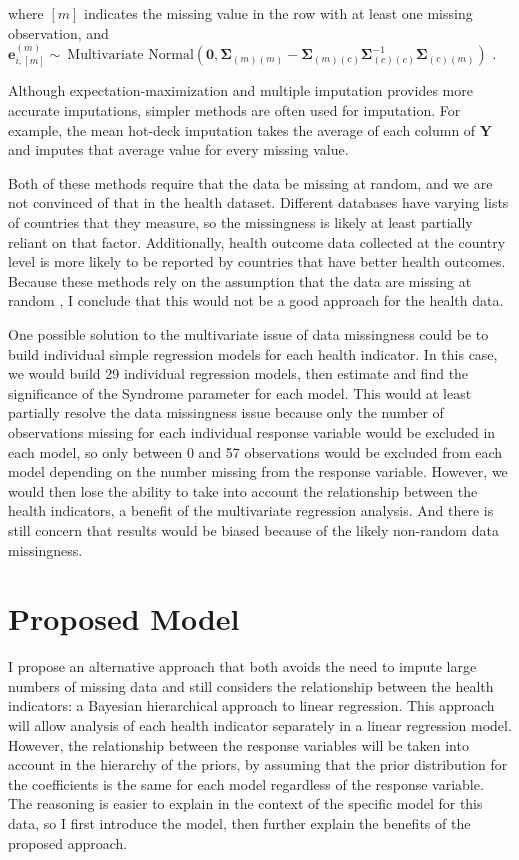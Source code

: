 where $[m]$ indicates the missing value in the row with at least one missing observation, and $\mathbf{e}_{i,[m]}^{(m)} \sim\ \text{Multivariate Normal}(\mathbf{0},\boldsymbol{\Sigma}_{(m)(m)}-\boldsymbol{\Sigma}_{(m)(c)}\boldsymbol{\Sigma}_{(c)(c)}^{-1}\boldsymbol{\Sigma}_{(c)(m)})$ \citep{Rencher}.

Although expectation-maximization and multiple imputation provides more accurate imputations, simpler methods are often used for imputation. For example, the mean hot-deck imputation takes the average of each column of $\mathbf{Y}$ and imputes that average value for every missing value.

Both of these methods require that the data be missing at random, and we are not convinced of that in the health dataset. Different databases have varying lists of countries that they measure, so the missingness is likely at least partially reliant on that factor. Additionally, health outcome data collected at the country level is more likely to be reported by countries that have better health outcomes. Because these methods rely on the assumption that the data are missing at random \citep{Rencher}, I conclude that this would not be a good approach for the health data.

One possible solution to the multivariate issue of data missingness could be to build individual simple regression models for each health indicator. In this case, we would build 29 individual regression models, then estimate and find the significance of the Syndrome parameter for each model. This would at least partially resolve the data missingness issue because only the number of observations missing for each individual response variable would be excluded in each model, so only between 0 and 57 observations would be excluded from each model depending on the number missing from the response variable. However, we would then lose the ability to take into account the relationship between the health indicators, a benefit of the multivariate regression analysis. And there is still concern that results would be biased because of the likely non-random data missingness.

\section{Proposed Model}

I propose an alternative approach that both avoids the need to impute large numbers of missing data and still considers the relationship between the health indicators: a Bayesian hierarchical approach to linear regression. This approach will allow analysis of each health indicator separately in a linear regression model. However, the relationship between the response variables will be taken into account in the hierarchy of the priors, by assuming that the prior distribution for the coefficients is the same for each model regardless of the response variable. The reasoning is easier to explain in the context of the specific model for this data, so I first introduce the model, then further explain the benefits of the proposed approach. 


